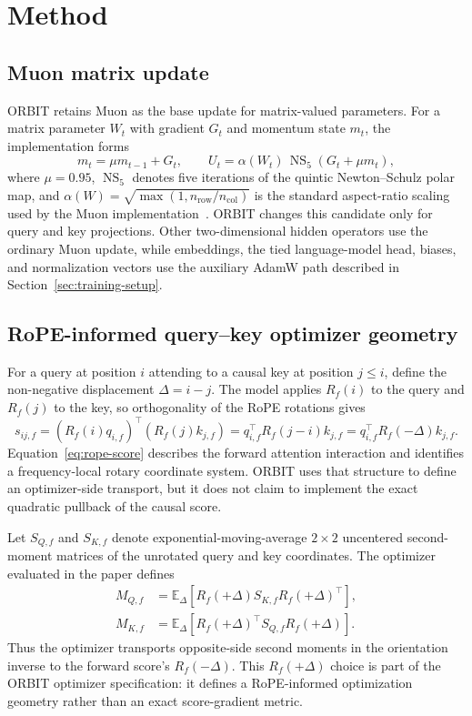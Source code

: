 \section{Method}

\subsection{Muon matrix update}
ORBIT retains Muon as the base update for matrix-valued parameters. For a matrix parameter
$W_t$ with gradient $G_t$ and momentum state $m_t$, the implementation forms
\begin{equation}
m_t=\mu m_{t-1}+G_t,\qquad
U_t=\alpha(W_t)\,\operatorname{NS}_5\!\left(G_t+\mu m_t\right),
\label{eq:muon-candidate}
\end{equation}
where $\mu=0.95$, $\operatorname{NS}_5$ denotes five iterations of the quintic
Newton--Schulz polar map, and
$\alpha(W)=\sqrt{\max(1,n_{\mathrm{row}}/n_{\mathrm{col}})}$ is the standard
aspect-ratio scaling used by the Muon implementation~\cite{jordan2024muon}. ORBIT changes
this candidate only for query and key projections. Other two-dimensional hidden operators
use the ordinary Muon update, while embeddings, the tied language-model head, biases, and
normalization vectors use the auxiliary AdamW path described in
Section~\ref{sec:training-setup}.

\subsection{RoPE-informed query--key optimizer geometry}
For a query at position $i$ attending to a causal key at position $j\le i$, define the
non-negative displacement $\Delta=i-j$. The model applies $R_f(i)$ to the query and
$R_f(j)$ to the key, so orthogonality of the RoPE rotations gives
\begin{equation}
  s_{ij,f}
  =(R_f(i)q_{i,f})^\top(R_f(j)k_{j,f})
  =q_{i,f}^{\top}R_f(j-i)k_{j,f}
  =q_{i,f}^{\top}R_f(-\Delta)k_{j,f}.
  \label{eq:rope-score}
\end{equation}
Equation~\ref{eq:rope-score} describes the forward attention interaction and identifies a
frequency-local rotary coordinate system. ORBIT uses that structure to define an
optimizer-side transport, but it does not claim to implement the exact quadratic pullback
of the causal score.

Let $S_{Q,f}$ and $S_{K,f}$ denote exponential-moving-average $2\times2$ uncentered
second-moment matrices of the unrotated query and key coordinates. The optimizer evaluated
in the paper defines
\begin{align}
M_{Q,f} &= \mathbb{E}_{\Delta}\!\left[
R_f(+\Delta)S_{K,f}R_f(+\Delta)^\top\right],\label{eq:orbit-metric-q}\\
M_{K,f} &= \mathbb{E}_{\Delta}\!\left[
R_f(+\Delta)^\top S_{Q,f}R_f(+\Delta)\right].\label{eq:orbit-metric-k}
\end{align}
Thus the optimizer transports opposite-side second moments in the orientation inverse to
the forward score's $R_f(-\Delta)$. This $R_f(+\Delta)$ choice is part of the ORBIT
optimizer specification: it defines a RoPE-informed optimization geometry rather than an
exact score-gradient metric.

